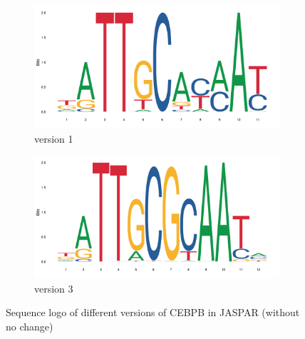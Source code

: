 \documentclass{PHlab-thesis}
\begin{document}
\begin{figure}[H]
	\centering
	\begin{subfigure}[b]{0.45\textwidth}
		\includegraphics[width=\textwidth]{figures/v1.png}
		\caption{version 1}
		\label{fig:CEBPBv1} 
	\end{subfigure}
	\begin{subfigure}[b]{0.45\textwidth}
		\includegraphics[width=\textwidth]{figures/v3.png}
		\caption{version 3}
	\end{subfigure}
	\caption{Sequence logo of different versions of CEBPB in JASPAR (without no change)}
	\label{fig:CEBPBv1v3} 
\end{figure}
\end{document}
